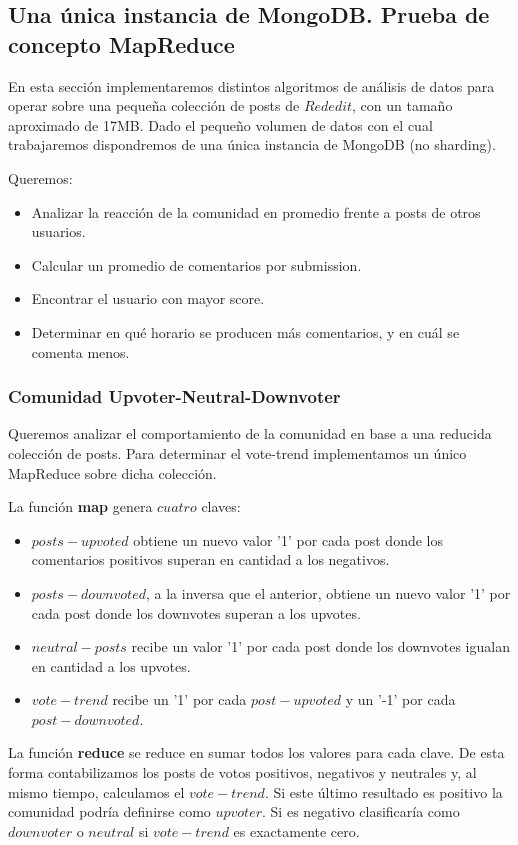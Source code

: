 \subsection{Una única instancia de MongoDB. Prueba de concepto MapReduce}


En esta sección implementaremos distintos algoritmos de análisis de datos para operar sobre una peque\~na colección de posts de $Rededit$, con un tama\~no aproximado de 17MB. Dado el peque\~no volumen de datos con el cual trabajaremos dispondremos de una única instancia de MongoDB (no sharding).


Queremos:
\begin{itemize}
	\item Analizar la reacción de la comunidad en promedio frente a posts de otros usuarios.
	\item Calcular un promedio de comentarios por submission.
	\item Encontrar el usuario con mayor score.
	\item Determinar en qué horario se producen más comentarios, y en cuál se comenta menos.
\end{itemize}


\subsubsection{Comunidad Upvoter-Neutral-Downvoter}

Queremos analizar el comportamiento de la comunidad en base a una reducida colección de posts. Para determinar el vote-trend implementamos un único MapReduce sobre dicha colección.


La función \textbf{map} genera $cuatro$ claves:
\begin{itemize}
	\item $posts-upvoted$ obtiene un nuevo valor '1' por cada post donde los comentarios positivos superan en cantidad a los negativos.
	\item $posts-downvoted$, a la inversa que el anterior, obtiene un nuevo valor '1' por cada post donde los downvotes superan a los upvotes.
	\item $neutral-posts$ recibe un valor '1' por cada post donde los downvotes igualan en cantidad a los upvotes.
	\item $vote-trend$ recibe un '1' por cada $post-upvoted$ y un '-1' por cada $post-downvoted$.
\end{itemize}


La función \textbf{reduce} se reduce en sumar todos los valores para cada clave. De esta forma contabilizamos los posts de votos positivos, negativos y neutrales y, al mismo tiempo, calculamos el $vote-trend$. Si este último resultado es positivo la comunidad podría definirse como $upvoter$. Si es negativo clasificaría como $downvoter$ o $neutral$ si $vote-trend$ es exactamente cero. 

